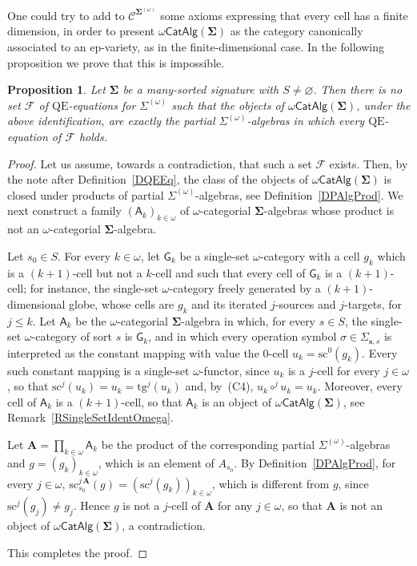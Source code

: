 \documentclass[a4paper, reqno
]{amsart}
\newcommand{\sig}[1]{\mathbf{#1}}             %
\newcommand{\calg}[1]{\boldsymbol{\mathsf{#1}}} %
\newcommand{\QE}{\mathrm{QE}}
\newcommand{\src}{\mathrm{sc}}
\newcommand{\tgt}{\mathrm{tg}}
\theoremstyle{plain}
\newtheorem{proposition}[theorem]{Proposition}
\theoremstyle{definition}
\begin{document}
One could try to add to $\mathcal{C}^{\sig{\Sigma}^{(\omega)}}$ some axioms expressing that every cell has a finite dimension, in order to present $\omega\mathsf{CatAlg}(\sig{\Sigma})$ as the category canonically associated to an ep-variety, as in the finite-dimensional case.
In the following proposition we prove that this is impossible.

\begin{proposition}\label{PFiniteDimNotQE}
Let $\sig{\Sigma}$ be a many-sorted signature with $S\neq\varnothing$.
Then there is no set $\mathcal{F}$ of $\QE$-equations for $\Sigma^{(\omega)}$ such that the objects of $\omega\mathsf{CatAlg}(\sig{\Sigma})$, under the above identification, are exactly the partial $\Sigma^{(\omega)}$-algebras in which every $\QE$-equation of $\mathcal{F}$ holds.
\end{proposition}
\begin{proof}
Let us assume, towards a contradiction, that such a set $\mathcal{F}$ exists.
Then, by the note after Definition~\ref{DQEEq}, the class of the objects of $\omega\mathsf{CatAlg}(\sig{\Sigma})$ is closed under products of partial $\Sigma^{(\omega)}$-algebras, see Definition~\ref{DPAlgProd}.
We next construct a family $(\calg{A}_{k})_{k\in\omega}$ of $\omega$-categorial $\sig{\Sigma}$-algebras whose product is not an $\omega$-categorial $\sig{\Sigma}$-algebra.

Let $s_{0}\in S$.
For every $k\in\omega$, let $\mathsf{G}_{k}$ be a single-set $\omega$-category with a cell $g_{k}$ which is a $(k+1)$-cell but not a $k$-cell and such that every cell of $\mathsf{G}_{k}$ is a $(k+1)$-cell; for instance, the single-set $\omega$-category freely generated by a $(k+1)$-dimensional globe, whose cells are $g_{k}$ and its iterated $j$-sources and $j$-targets, for $j\leq k$.
Let $\calg{A}_{k}$ be the $\omega$-categorial $\sig{\Sigma}$-algebra in which, for every $s\in S$, the single-set $\omega$-category of sort $s$ is $\mathsf{G}_{k}$, and in which every operation symbol $\sigma\in\Sigma_{\mathbf{s},s}$ is interpreted as the constant mapping with value the $0$-cell $u_{k}=\src^{0}(g_{k})$.
Every such constant mapping is a single-set $\omega$-functor, since $u_{k}$ is a $j$-cell for every $j\in\omega$, so that $\src^{j}(u_{k})=u_{k}=\tgt^{j}(u_{k})$ and, by~(C4), $u_{k}\circ^{j}u_{k}=u_{k}$.
Moreover, every cell of $\calg{A}_{k}$ is a $(k+1)$-cell, so that $\calg{A}_{k}$ is an object of $\omega\mathsf{CatAlg}(\sig{\Sigma})$, see Remark~\ref{RSingleSetIdentOmega}.

Let $\mathbf{A}=\prod_{k\in\omega}\calg{A}_{k}$ be the product of the corresponding partial $\Sigma^{(\omega)}$-algebras and $g=(g_{k})_{k\in\omega}$, which is an element of $A_{s_{0}}$.
By Definition~\ref{DPAlgProd}, for every $j\in\omega$, $\src^{j\,\mathbf{A}}_{s_{0}}(g)=(\src^{j}(g_{k}))_{k\in\omega}$, which is different from $g$, since $\src^{j}(g_{j})\neq g_{j}$.
Hence $g$ is not a $j$-cell of $\mathbf{A}$ for any $j\in\omega$, so that $\mathbf{A}$ is not an object of $\omega\mathsf{CatAlg}(\sig{\Sigma})$, a contradiction.

This completes the proof.
\end{proof}
\end{document}
